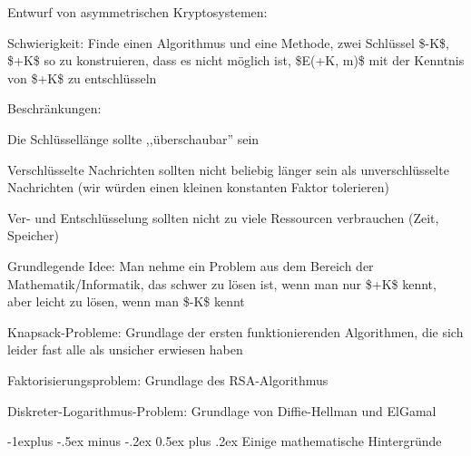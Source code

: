 \documentclass[a4paper]{article}
\makeatletter
\renewcommand{\subsection}{\@startsection{subsection}{2}{0mm}%
 {-1explus -.5ex minus -.2ex}%
 {0.5ex plus .2ex}%
 {\normalfont\normalsize\bfseries}}
\makeatother
\begin{document}
\begin{multicols}{3}
\begin{itemize*}
\begin{itemize*}
            \end{itemize*}
            \item Entwurf von asymmetrischen Kryptosystemen:
            \begin{itemize*}
                  \item Schwierigkeit: Finde einen Algorithmus und eine Methode, zwei Schlüssel \$-K\$, \$+K\$ so zu konstruieren, dass es nicht möglich ist, \$E(+K, m)\$ mit der Kenntnis von \$+K\$ zu entschlüsseln
                  \item Beschränkungen:
                  \begin{itemize*} \item Die Schlüssellänge sollte ,,überschaubar'' sein \item Verschlüsselte Nachrichten sollten nicht beliebig länger sein als unverschlüsselte Nachrichten (wir würden einen kleinen konstanten Faktor tolerieren) \item Ver- und Entschlüsselung sollten nicht zu viele Ressourcen verbrauchen (Zeit, Speicher) \end{itemize*}
                  \item Grundlegende Idee: Man nehme ein Problem aus dem Bereich der Mathematik/Informatik, das schwer zu lösen ist, wenn man nur \$+K\$ kennt, aber leicht zu lösen, wenn man \$-K\$ kennt
                  \begin{itemize*} \item Knapsack-Probleme: Grundlage der ersten funktionierenden Algorithmen, die sich leider fast alle als unsicher erwiesen haben \item Faktorisierungsproblem: Grundlage des RSA-Algorithmus \item Diskreter-Logarithmus-Problem: Grundlage von Diffie-Hellman und ElGamal \end{itemize*}
            \end{itemize*}
      \end{itemize*}


      \subsection{Einige mathematische
            Hintergründe}


\end{multicols}
\end{document}
